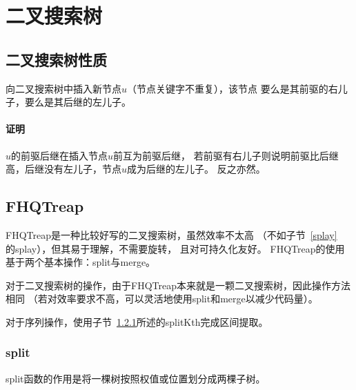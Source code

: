 \section{二叉搜索树}
\subsection{二叉搜索树性质}
\begin{property}
    向二叉搜索树中插入新节点$u$（节点关键字不重复），该节点
    要么是其前驱的右儿子，要么是其后继的左儿子。
\end{property}
\paragraph{证明} $u$的前驱后继在插入节点$u$前互为前驱后继，
若前驱有右儿子则说明前驱比后继高，后继没有左儿子，节点$u$成为后继的左儿子。
反之亦然。
\subsection{FHQTreap}\label{FHQTreap}
FHQTreap是一种比较好写的二叉搜索树，虽然效率不太高
（不如子节~\ref{splay}\\的splay），但其易于理解，不需要旋转，
且对可持久化友好。
FHQTreap的使用基于两个基本操作：split与merge。

对于二叉搜索树的操作，由于FHQTreap本来就是一颗二叉搜索树，因此操作方法相同
（若对效率要求不高，可以灵活地使用split和merge以减少代码量）。

对于序列操作，使用子节~\ref{split}所述的splitKth完成区间提取。

\subsubsection{split}\label{split}

split函数的作用是将一棵树按照权值或位置划分成两棵子树。

